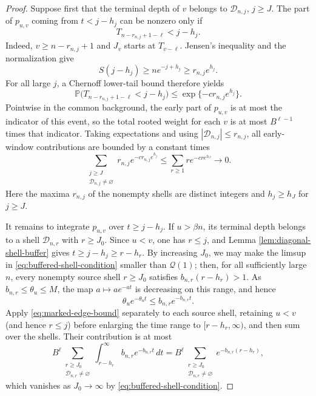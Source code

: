 \documentclass[11pt]{article}
\theoremstyle{remark}
\theoremstyle{plain}
\newcommand{\Pp}{\mathbb P}
\begin{document}
\begin{proof}
Suppose first that the terminal depth of $v$ belongs to
$\mathcal D_{n,j}$, $j\ge J$.  The part of $p_{u,v}$ coming from
$t<j-h_j$ can be nonzero only if
\[
 T_{n-r_{n,j}+1-\ell}<j-h_j.
\]
Indeed, $v\ge n-r_{n,j}+1$ and $J_v$ starts at $T_{v-\ell}$.  Jensen's
inequality and the normalization give
\[
 S(j-h_j)\ge ne^{-j+h_j}\ge r_{n,j}e^{h_j}.
\]
For all large $j$, a Chernoff lower-tail bound therefore yields
\[
 \Pp\bigl(T_{n-r_{n,j}+1-\ell}<j-h_j\bigr)
 \le \exp\{-c r_{n,j}e^{h_j}\}.
\]
Pointwise in the common background, the early part of $p_{u,v}$ is at most
the indicator of this event, so the total rooted weight for each $v$ is at
most $B^{\ell-1}$ times that indicator.  Taking expectations and using
$|\mathcal D_{n,j}|\le r_{n,j}$, all early-window contributions are bounded
by a constant times
\begin{equation}\label{eq:early-cycle-shells}
 \sum_{\substack{j\ge J\\\mathcal D_{n,j}\ne\varnothing}}
 r_{n,j}e^{-c r_{n,j}e^{h_j}}
 \le\sum_{r\ge1}r e^{-c r e^{h_J}}
 \longrightarrow0.
\end{equation}
Here the maxima $r_{n,j}$ of the nonempty shells are distinct integers and
$h_j\ge h_J$ for $j\ge J$.

It remains to integrate $p_{u,v}$ over $t\ge j-h_j$.  If $u>\beta n$, its
terminal depth belongs to a shell $\mathcal D_{n,r}$ with $r\ge J_0$.
Since $u<v$, one has $r\le j$, and Lemma
\ref{lem:diagonal-shell-buffer} gives
$t\ge j-h_j\ge r-h_r$.  By increasing $J_0$, we may make the limsup in
\eqref{eq:buffered-shell-condition} smaller than $\mathcal Q(1)$; then, for
all sufficiently large $n$, every nonempty source shell $r\ge J_0$ satisfies
$b_{n,r}(r-h_r)>1$.  As
$b_{n,r}\le\theta_u\le M$, the map $a\mapsto ae^{-at}$ is decreasing on
this range, and hence
\[
 \theta_u e^{-\theta_u t}\le b_{n,r}e^{-b_{n,r}t}.
\]
Apply \eqref{eq:marked-edge-bound} separately to each source shell,
retaining $u<v$ (and hence $r\le j$) before enlarging the time range to
$[r-h_r,\infty)$, and then sum over the shells.  Their contribution is
at most
\begin{equation}\label{eq:late-cycle-shells}
 B^\ell\sum_{\substack{r\ge J_0\\\mathcal D_{n,r}\ne\varnothing}}
 \int_{r-h_r}^\infty b_{n,r}e^{-b_{n,r}t}\,dt
 =B^\ell\sum_{\substack{r\ge J_0\\\mathcal D_{n,r}\ne\varnothing}}
 e^{-b_{n,r}(r-h_r)},
\end{equation}
which vanishes as $J_0\to\infty$ by
\eqref{eq:buffered-shell-condition}.


\end{proof}
\end{document}
